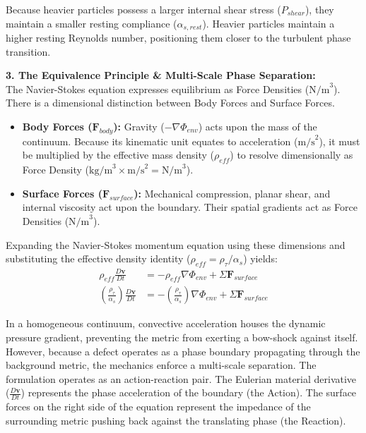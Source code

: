 Because heavier particles possess a larger internal shear stress ($P_{shear}$), they maintain a smaller resting compliance ($\alpha_{s,rest}$). Heavier particles maintain a higher resting Reynolds number, positioning them closer to the turbulent phase transition. %

\vspace{0.2 cm}

\textbf{3. The Equivalence Principle \& Multi-Scale Phase Separation:} \\
The Navier-Stokes equation expresses equilibrium as Force Densities ($\text{N/m}^3$). There is a dimensional distinction between Body Forces and Surface Forces. %
\begin{itemize}[nosep]
    \item \textbf{Body Forces ($\mathbf{F}_{body}$):} Gravity ($-\nabla \Phi_{env}$) acts upon the mass of the continuum. Because its kinematic unit equates to acceleration ($\text{m/s}^2$), it must be multiplied by the effective mass density ($\rho_{eff}$) to resolve dimensionally as Force Density ($\text{kg/m}^3 \times \text{m/s}^2 = \text{N/m}^3$). %
    \item \textbf{Surface Forces ($\mathbf{F}_{surface}$):} Mechanical compression, planar shear, and internal viscosity act upon the boundary. Their spatial gradients act as Force Densities ($\text{N/m}^3$). %
\end{itemize}

Expanding the Navier-Stokes momentum equation using these dimensions and substituting the effective density identity ($\rho_{eff} = \rho_\tau/\alpha_s$) yields: %
\begin{align}
    \rho_{eff} \frac{D\mathbf{v}}{Dt} &= -\rho_{eff} \nabla \Phi_{env} + \Sigma \mathbf{F}_{surface} \\ 
    \left( \frac{\rho_\tau}{\alpha_s} \right) \frac{D\mathbf{v}}{Dt} &= -\left( \frac{\rho_\tau}{\alpha_s} \right) \nabla \Phi_{env} + \Sigma \mathbf{F}_{surface} 
\end{align}

In a homogeneous continuum, convective acceleration houses the dynamic pressure gradient, preventing the metric from exerting a bow-shock against itself. However, because a defect operates as a phase boundary propagating through the background metric, the mechanics enforce a multi-scale separation. The formulation operates as an action-reaction pair. The Eulerian material derivative ($\frac{D\mathbf{v}}{Dt}$) represents the phase acceleration of the boundary (the Action). The surface forces on the right side of the equation represent the impedance of the surrounding metric pushing back against the translating phase (the Reaction). %

